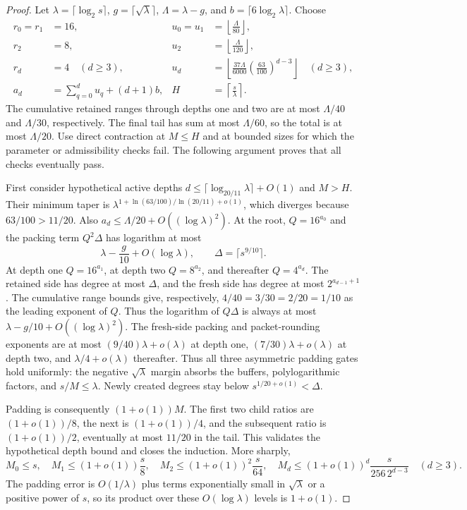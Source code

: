 \begin{proof}
Let $\lambda=\lceil\log_2s\rceil$,
$g=\lceil\sqrt\lambda\rceil$, $\Lambda=\lambda-g$, and
$b=\lceil6\log_2\lambda\rceil$. Choose
\begin{align*}
 r_0=r_1&=16,&u_0=u_1&=\left\lfloor\frac{\Lambda}{80}\right\rfloor,\\
 r_2&=8,&u_2&=\left\lfloor\frac{\Lambda}{120}\right\rfloor,\\
 r_d&=4\quad(d\ge3),&u_d&=
 \left\lfloor\frac{37\Lambda}{6000}
          \left(\frac{63}{100}\right)^{d-3}\right\rfloor\quad(d\ge3),\\
 a_d&=\sum_{q=0}^d u_q+(d+1)b,&
 H&=\left\lceil\frac{s}{\lambda}\right\rceil.
\end{align*}
The cumulative retained ranges through depths one and two are at most
$\Lambda/40$ and $\Lambda/30$, respectively. The final tail has sum at
most $\Lambda/60$, so the total is at most $\Lambda/20$.
Use direct contraction
at $M\le H$ and at bounded sizes for which the parameter or admissibility
checks fail. The following argument proves that all checks eventually pass.

First consider hypothetical active depths
$d\le\lceil\log_{20/11}\lambda\rceil+O(1)$ and $M>H$. Their minimum taper is
$\lambda^{1+\ln(63/100)/\ln(20/11)+o(1)}$, which diverges because
$63/100>11/20$. Also $a_d\le\Lambda/20+O((\log\lambda)^2)$.
At the root, $Q=16^{a_0}$ and the packing term $Q^2\Delta$ has logarithm at most
\[
 \lambda-\frac{g}{10}+O(\log\lambda),
 \qquad \Delta=\lceil s^{9/10}\rceil.
\]
At depth one $Q=16^{a_1}$, at depth two $Q=8^{a_2}$, and thereafter
$Q=4^{a_d}$. The retained side has degree at most $\Delta$, and the fresh
side has degree at most $2^{a_{d-1}+1}$. The cumulative range bounds give,
respectively, $4/40=3/30=2/20=1/10$ as the leading exponent of $Q$.
Thus the logarithm of $Q\Delta$ is always at most
$\lambda-g/10+O((\log\lambda)^2)$.
The fresh-side packing and packet-rounding exponents are at most
$(9/40)\lambda+o(\lambda)$ at depth one,
$(7/30)\lambda+o(\lambda)$ at depth two, and
$\lambda/4+o(\lambda)$ thereafter. Thus all three asymmetric padding gates hold
uniformly: the negative $\sqrt\lambda$ margin absorbs the buffers,
polylogarithmic factors, and $s/M\le\lambda$. Newly created degrees stay
below $s^{1/20+o(1)}<\Delta$.

Padding is consequently $(1+o(1))M$. The first two child ratios are
$(1+o(1))/8$, the next is $(1+o(1))/4$, and the subsequent ratio is
$(1+o(1))/2$, eventually at most $11/20$ in the tail.
This validates the hypothetical depth bound and closes the
induction. More sharply,
\[
 M_0\le s,\quad M_1\le(1+o(1))\frac{s}{8},\quad
 M_2\le(1+o(1))^2\frac{s}{64},\quad
 M_d\le(1+o(1))^d\frac{s}{256\,2^{d-3}}\quad(d\ge3).
\]
The padding error is $O(1/\lambda)$ plus terms exponentially small in
$\sqrt\lambda$ or a positive power of $s$, so its product over these
$O(\log\lambda)$ levels is $1+o(1)$.


\end{proof}
